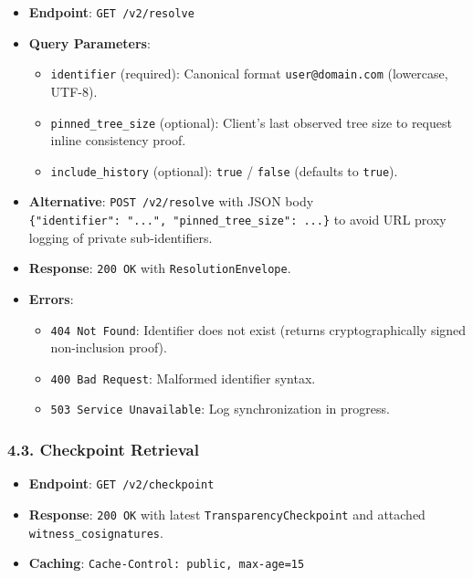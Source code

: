\documentclass[
]{article}
\providecommand{\tightlist}{%
  \setlength{\itemsep}{0pt}\setlength{\parskip}{0pt}}
\begin{document}
\begin{itemize}
\tightlist
\item
  \textbf{Endpoint}: \texttt{GET\ /v2/resolve}
\item
  \textbf{Query Parameters}:

  \begin{itemize}
  \tightlist
  \item
    \texttt{identifier} (required): Canonical format
    \texttt{user@domain.com} (lowercase, UTF-8).
  \item
    \texttt{pinned\_tree\_size} (optional): Client's last observed tree
    size to request inline consistency proof.
  \item
    \texttt{include\_history} (optional): \texttt{true} / \texttt{false}
    (defaults to \texttt{true}).
  \end{itemize}
\item
  \textbf{Alternative}: \texttt{POST\ /v2/resolve} with JSON body
  \texttt{\{"identifier":\ "...",\ "pinned\_tree\_size":\ ...\}} to
  avoid URL proxy logging of private sub-identifiers.
\item
  \textbf{Response}: \texttt{200\ OK} with \texttt{ResolutionEnvelope}.
\item
  \textbf{Errors}:

  \begin{itemize}
  \tightlist
  \item
    \texttt{404\ Not\ Found}: Identifier does not exist (returns
    cryptographically signed non-inclusion proof).
  \item
    \texttt{400\ Bad\ Request}: Malformed identifier syntax.
  \item
    \texttt{503\ Service\ Unavailable}: Log synchronization in progress.
  \end{itemize}
\end{itemize}

\hypertarget{checkpoint-retrieval}{%
\subsubsection{4.3. Checkpoint Retrieval}\label{checkpoint-retrieval}}

\begin{itemize}
\tightlist
\item
  \textbf{Endpoint}: \texttt{GET\ /v2/checkpoint}
\item
  \textbf{Response}: \texttt{200\ OK} with latest
  \texttt{TransparencyCheckpoint} and attached
  \texttt{witness\_cosignatures}.
\item
  \textbf{Caching}: \texttt{Cache-Control:\ public,\ max-age=15}
\end{itemize}
\end{document}
